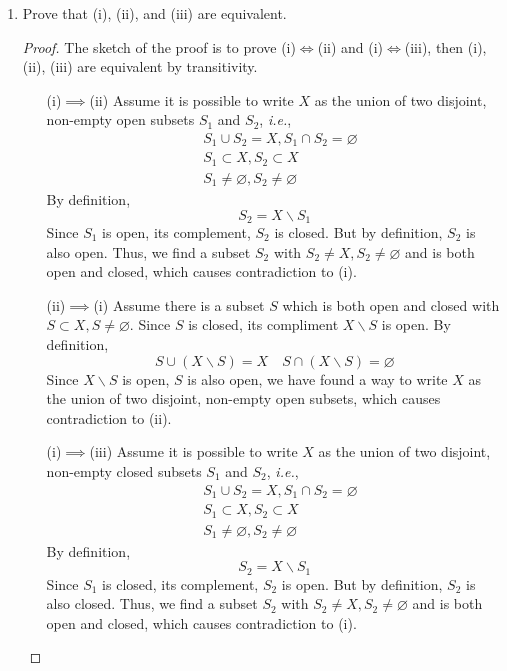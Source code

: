 \begin{enumerate}
	\item Prove that (i), (ii), and (iii) are equivalent.
    \begin{proof}
    The sketch of the proof is to prove (i)$\iff$(ii) and (i)$\iff$(iii), then (i), (ii), (iii) are equivalent by transitivity.
    \begin{itemize}
    	\item[(i)$\implies$(ii)]
        Assume it is possible to write $X$ as the union of two disjoint, non-empty open subsets $S_1$ and $S_2$, \textit{i.e.},
        \begin{align*}
        	&S_1\cup S_2=X,S_1\cap S_2=\varnothing \\
            &S_1\subset X, S_2\subset X\\
            &S_1\neq\varnothing, S_2\neq\varnothing
        \end{align*}
        By definition,
        \[ S_2=X\backslash S_1 \]
        Since $S_1$ is open, its complement, $S_2$ is closed.
        But by definition, $S_2$ is also open.
        Thus, we find a subset $S_2$ with \(S_2\neq X,S_2\neq\varnothing\) and is both open and closed, which causes contradiction to (i).
        \item[(ii)$\implies$(i)]
        Assume there is a subset $S$ which is both open and closed with \(S\subset X, S\neq\varnothing\).
        Since $S$ is closed, its compliment \(X\backslash S\) is open.
        By definition,
        \[ S\cup (X\backslash S)=X \quad S\cap(X\backslash S)=\varnothing \]
        Since \(X\backslash S\) is open, $S$ is also open, we have found a way to write $X$ as the union of two disjoint, non-empty open subsets, which causes contradiction to (ii).
    	\item[(i)$\implies$(iii)]
        Assume it is possible to write $X$ as the union of two disjoint, non-empty closed subsets $S_1$ and $S_2$, \textit{i.e.},
        \begin{align*}
        	&S_1\cup S_2=X,S_1\cap S_2=\varnothing \\
            &S_1\subset X, S_2\subset X\\
            &S_1\neq\varnothing, S_2\neq\varnothing
        \end{align*}
        By definition,
        \[ S_2=X\backslash S_1 \]
        Since $S_1$ is closed, its complement, $S_2$ is open.
        But by definition, $S_2$ is also closed.
        Thus, we find a subset $S_2$ with \(S_2\neq X,S_2\neq\varnothing\) and is both open and closed, which causes contradiction to (i).

\end{itemize}
\end{proof}
\end{enumerate}
